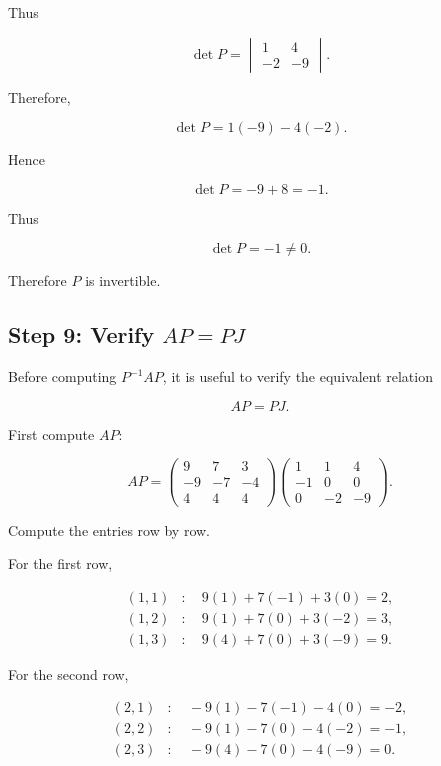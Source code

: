 \documentclass[11pt]{article}
\begin{document}
Thus

\[
\det P
=
\begin{vmatrix}
1&4\\
-2&-9
\end{vmatrix}.
\]

Therefore,

\[
\det P
=
1(-9)-4(-2).
\]

Hence

\[
\det P=-9+8=-1.
\]

Thus

\[
\boxed{
\det P=-1\neq0.
}
\]

Therefore \(P\) is invertible.


\subsection{Step 9: Verify \(AP=PJ\)}

Before computing \(P^{-1}AP\), it is useful to verify the equivalent
relation

\[
AP=PJ.
\]

First compute \(AP\):

\[
AP
=
\begin{pmatrix}
9&7&3\\
-9&-7&-4\\
4&4&4
\end{pmatrix}
\begin{pmatrix}
1&1&4\\
-1&0&0\\
0&-2&-9
\end{pmatrix}.
\]

Compute the entries row by row.

For the first row,

\[
\begin{aligned}
(1,1)&:\quad 9(1)+7(-1)+3(0)=2,\\
(1,2)&:\quad 9(1)+7(0)+3(-2)=3,\\
(1,3)&:\quad 9(4)+7(0)+3(-9)=9.
\end{aligned}
\]

For the second row,

\[
\begin{aligned}
(2,1)&:\quad -9(1)-7(-1)-4(0)=-2,\\
(2,2)&:\quad -9(1)-7(0)-4(-2)=-1,\\
(2,3)&:\quad -9(4)-7(0)-4(-9)=0.
\end{aligned}
\]
\end{document}
